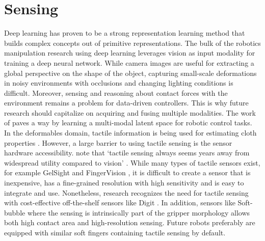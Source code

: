 \documentclass[\home/main.tex]{subfiles}
\begin{document}
\section{Sensing}
Deep learning has proven to be a strong representation learning method that builds complex concepts out of primitive representations. The bulk of the robotics manipulation research using deep learning leverages vision as input modality for training a deep neural network. While camera images are useful for extracting a global perspective on the shape of the object, capturing small-scale deformations in noisy environments with occlusions and changing lighting conditions is difficult. Moreover, sensing and reasoning about contact forces with the environment remains a problem for data-driven controllers. This is why future research should capitalize on acquiring and fusing multiple modalities. The work of \autocite{lee2020making} paves a way by learning a multi-modal latent space for robotic control tasks. In the deformables domain, tactile information is being used for estimating cloth properties \autocite{yuan2018active}. However, a large barrier to using tactile sensing is the sensor hardware accessibility. \citeauthor{Siciliano2008} note that `tactile sensing always seems years away from widespread utility compared to vision' \autocite{Siciliano2008}. While many types of tactile sensors exist, for example GelSight \autocite{donlon2018gelslim} and FingerVision \autocite{Yamaguchi2017}, it is difficult to create a sensor that is inexpensive, has a fine-grained resolution with high sensitivity and is easy to integrate and use. Nonetheless, research recognizes the need for tactile sensing with cost-effective off-the-shelf sensors like Digit \autocite{digit2020}. In addition, sensors like Soft-bubble \autocite{Alspach2019} where the sensing is intrinsically part of the gripper morphology allows both high contact area and high-resolution sensing. Future robots preferably are equipped with similar soft fingers containing tactile sensing by default. 
\end{document}
